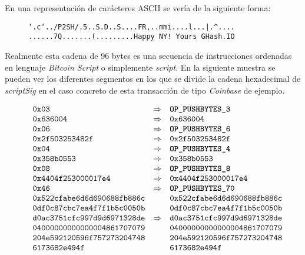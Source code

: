 \documentclass{article}
\begin{document}
    En una representación de carácteres ASCII se vería de la siguiente forma:
    \begin{figure}[H]
    \centering
        \texttt{`.c`../P2SH/.5..S.D..S....FR,..mmi....l...|.\textasciicircum....}
        \texttt{......7Q.......(.........Happy NY! Yours GHash.IO}
    \end{figure}
    
    Realmente esta cadena de 96 bytes es una secuencia de instrucciones ordenadas en lenguaje \textit{Bitcoin Script} o simplemente \textit{script}. En la siguiente muestra se pueden ver los diferentes segmentos en los que se divide la cadena hexadecimal de \textit{scriptSig} en el caso concreto de esta transacción de tipo \textit{Coinbase} de ejemplo.
    
    \begin{figure}[H]
        $\begin{array}{lcl}
            \texttt{0x03} & \Rightarrow & \textbf{\texttt{OP\_PUSHBYTES\_3}} \\
            \texttt{0x636004} & \Rightarrow & \texttt{0x636004}\\
            \texttt{0x06} & \Rightarrow & \textbf{\texttt{OP\_PUSHBYTES\_6}} \\
            \texttt{0x2f503253482f} & \Rightarrow & \texttt{0x2f503253482f} \\
            \texttt{0x04} & \Rightarrow & \textbf{\texttt{OP\_PUSHBYTES\_4}} \\
            \texttt{0x358b0553} & \Rightarrow & \texttt{0x358b0553} \\
            \texttt{0x08} & \Rightarrow & \textbf{\texttt{OP\_PUSHBYTES\_8}} \\
            \texttt{0x4404f253000017e4} & \Rightarrow & \texttt{0x4404f253000017e4} \\
            \texttt{0x46} & \Rightarrow & \textbf{\texttt{OP\_PUSHBYTES\_70}} \\
            \texttt{0x522cfabe6d6d690688fb886c} & & \texttt{0x522cfabe6d6d690688fb886c} \\
            \texttt{0df0c87cbc7ea4f7f1b5c0050b} & & \texttt{0df0c87cbc7ea4f7f1b5c0050b} \\
            \texttt{d0ac3751cfc997d9d6971328de} & \Rightarrow & \texttt{d0ac3751cfc997d9d6971328de} \\
            \texttt{04000000000000004861707079} & & \texttt{04000000000000004861707079} \\
            \texttt{204e592120596f757273204748} & & \texttt{204e592120596f757273204748} \\
            \texttt{6173682e494f} & & \texttt{6173682e494f}
        \end{array}$
    \end{figure}
    
\end{document}
